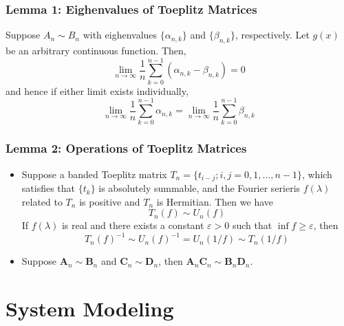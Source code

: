 \documentclass{beamer}
\begin{document}
\begin{frame}
\frametitle{Lemma 1: Eighenvalues of Toeplitz Matrices}
\begin{block}{}
  \cite[Lemma 1]{Gray:2006} Suppose $A_n\sim B_n$ with eighenvalues $\{\alpha_{n,k}\}$ and $\{\beta_{n,k}\}$, respectively. Let $g(x)$ be an arbitrary continuous function. Then,
  \begin{equation}
    \lim_{n\to\infty}\frac{1}{n}\sum_{k=0}^{n-1}(\alpha_{n,k}-\beta_{n,k})=0
  \end{equation}
  and hence if either limit exists individually,
  \begin{equation}
    \lim_{n\to\infty}\frac{1}{n}\sum_{k=0}^{n-1}\alpha_{n,k}=\lim_{n\to\infty}\frac{1}{n}\sum_{k=0}^{n-1}\beta_{n,k}
  \end{equation}
\end{block}
\end{frame}

\begin{frame}
\frametitle{Lemma 2: Operations of Toeplitz Matrices}
\begin{block}{}
  \cite[Lemma 7 and 10]{Gray:2006}
  \label{lemma2}
  \begin{itemize}
    \item Suppose a banded Toeplitz matrix $T_n=\{t_{i-j};i,j=0,1,\dots,n-1\}$, which satisfies that $\{t_k\}$ is absolutely summable, and the Fourier serieris $f(\lambda)$ related to $T_n$ is positive and $T_n$ is Hermitian.
  Then we have
  \begin{equation}
    T_n(f)\sim U_n(f)
  \end{equation}
  If $f(\lambda)$ is real and there exists a constant $\varepsilon>0$ such that $\inf{f}\geq\varepsilon$, then
  \begin{equation}
    T_n(f)^{-1}\sim U_n(f)^{-1}=U_n(1/f)\sim T_n(1/f)
  \end{equation}
\item Suppose $\pmb{A}_n\sim\pmb{B}_n$ and $\pmb{C}_n\sim\pmb{D}_n$, then $\pmb{A}_n\pmb{C}_n\sim\pmb{B}_n\pmb{D}_n$.
  \end{itemize}
\end{block}
\end{frame}



\section{System Modeling}
\end{document}
